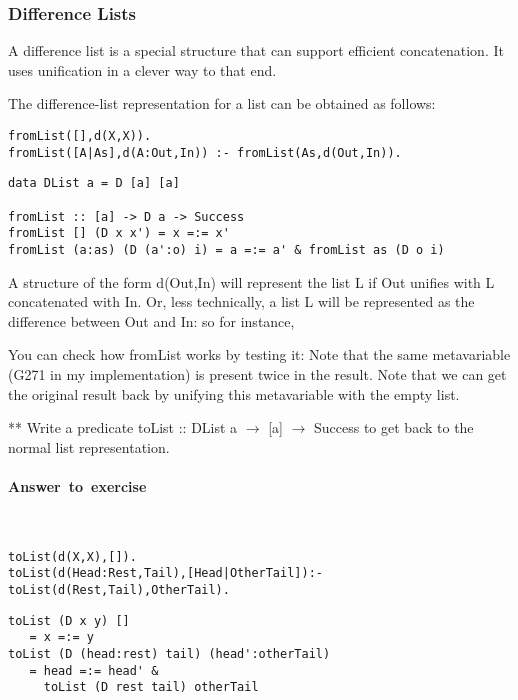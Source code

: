 \documentclass{article}
\newcounter{question}
\newenvironment{ans}{\begin{oframed}\paragraph{Answer~to~exercise~\arabic{question}}}{\end{oframed}}
\newcommand{\correctedLastYear}[1]{}
\begin{document}
\subsubsection{Difference Lists}

A difference list is a special structure that can support efficient
concatenation. It uses unification in a clever way to that end.

The difference-list representation for a list can be obtained as follows:

\Prolog{}
\begin{verbatim}
fromList([],d(X,X)).
fromList([A|As],d(A:Out,In)) :- fromList(As,d(Out,In)).
\end{verbatim}


\Curry{}
\begin{verbatim}
data DList a = D [a] [a]

fromList :: [a] -> D a -> Success
fromList [] (D x x') = x =:= x'
fromList (a:as) (D (a':o) i) = a =:= a' & fromList as (D o i)
\end{verbatim}


A structure of the form \textsf{d(Out,In)} will represent the list
\textsf{L} if \textsf{Out} unifies with \textsf{L} concatenated with
\textsf{In}. Or, less technically, a list L will be represented as the
difference between Out and In: so for instance,



You can check how fromList works by testing it:
Note that the same metavariable (G271 in my implementation) is present twice in
the result. Note that we can get the original result back by unifying this
metavariable with the empty list.

\begin{question}{**\correctedLastYear6}
Write a predicate \textsf{toList :: DList a $\rightarrow$ [a] $\rightarrow$ Success} to get back to the normal list representation.

\begin{ans}
~
\begin{verbatim}
toList(d(X,X),[]).
toList(d(Head:Rest,Tail),[Head|OtherTail]):- toList(d(Rest,Tail),OtherTail).
\end{verbatim}

\begin{verbatim}
toList (D x y) []
   = x =:= y
toList (D (head:rest) tail) (head':otherTail)
   = head =:= head' &
     toList (D rest tail) otherTail
\end{verbatim}

\end{ans}

\end{question}
\end{document}
